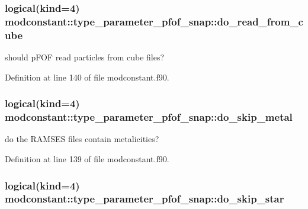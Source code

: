 \hypertarget{structmodconstant_1_1type__parameter__pfof__snap_a2eda60cfcb05e14b859d4912c4301700}{
\subsubsection[{do\-\_\-read\-\_\-from\-\_\-cube}]{\setlength{\rightskip}{0pt plus 5cm}logical(kind=4) modconstant\-::type\-\_\-parameter\-\_\-pfof\-\_\-snap\-::do\-\_\-read\-\_\-from\-\_\-cube}}\label{structmodconstant_1_1type__parameter__pfof__snap_a2eda60cfcb05e14b859d4912c4301700}


should p\-F\-O\-F read particles from cube files? 



Definition at line 140 of file modconstant.\-f90.

\hypertarget{structmodconstant_1_1type__parameter__pfof__snap_a348e60587afbd14ddb9a5f03afd4d825}{
\subsubsection[{do\-\_\-skip\-\_\-metal}]{\setlength{\rightskip}{0pt plus 5cm}logical(kind=4) modconstant\-::type\-\_\-parameter\-\_\-pfof\-\_\-snap\-::do\-\_\-skip\-\_\-metal}}\label{structmodconstant_1_1type__parameter__pfof__snap_a348e60587afbd14ddb9a5f03afd4d825}


do the R\-A\-M\-S\-E\-S files contain metalicities? 



Definition at line 139 of file modconstant.\-f90.

\hypertarget{structmodconstant_1_1type__parameter__pfof__snap_a3d5e01fcda7d62315fe063fd879fca30}{
\subsubsection[{do\-\_\-skip\-\_\-star}]{\setlength{\rightskip}{0pt plus 5cm}logical(kind=4) modconstant\-::type\-\_\-parameter\-\_\-pfof\-\_\-snap\-::do\-\_\-skip\-\_\-star}}\label{structmodconstant_1_1type__parameter__pfof__snap_a3d5e01fcda7d62315fe063fd879fca30}


